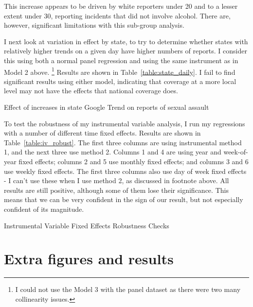 \documentclass[AER,draftmode]{AEA}
\begin{document}
This increase appears to be driven by white reporters under 20 and to a lesser extent under 30, reporting incidents that did not involve alcohol. There are, however, significant limitations with this sub-group analysis. 

I next look at variation in effect by state, to try to determine whether states with relatively higher trends on a given day have higher numbers of reports.  I consider this using both a normal panel regression and using the same instrument as in Model 2 above. \footnote{I could not use the Model 3 with the panel dataset as there were two many collinearity issues.} Results are shown in Table~\ref{table:state_daily}. I fail to find significant results using either model, indicating that coverage at a more local level may not have the effects that national coverage does.

\begin{table}[]
\caption{Effect of increases in state Google Trend on reports of sexual assault} \label{table:state_daily}

\end{table}

To test the robustness of my instrumental variable analysis, I run my regressions with a number of different time fixed effects. Results are shown in Table~\ref{table:iv_robust}. The first three columns are using instrumental method 1, and the next three use method 2. Columns 1 and 4 are using year and week-of-year fixed effects; columns 2 and 5 use monthly fixed effects; and columns 3 and 6 use weekly fixed effects. The first three columns also use day of week fixed effects - I can't use these when I use method 2, as discussed in footnote above. All results are still positive, although some of them lose their significance. This means that we can be very confident in the sign of our result, but not especially confident of its magnitude.

\begin{table}[]
\caption{Instrumental Variable Fixed Effects Robustness Checks} \label{table:iv_robust}

\end{table}

\clearpage
\section{Extra figures and results}
\end{document}
